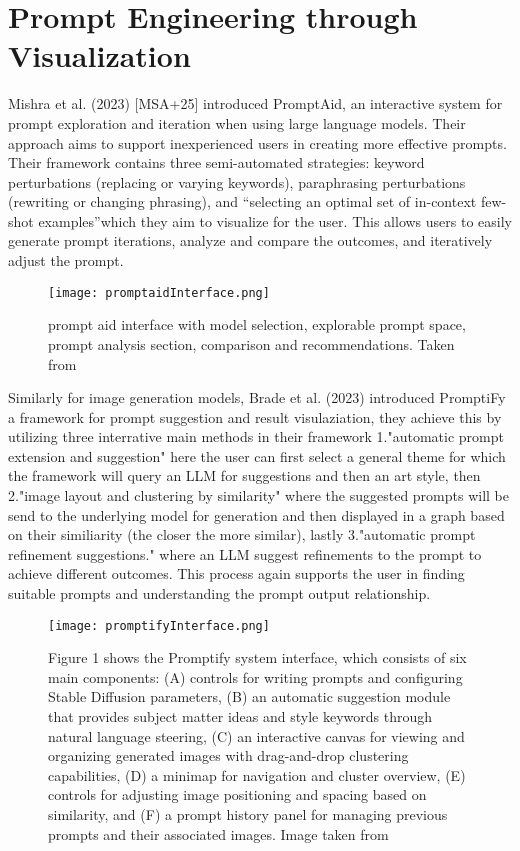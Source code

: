 \documentclass[
  a4paper,  %
  twoside,  %
  bibliography=totoc,
  headsepline,
  cleardoublepage=empty,
  parskip=half,
  draft=false
]{scrbook}
\begin{document}
\section{Prompt Engineering through Visualization}
Mishra et al. (2023) [MSA+25] introduced PromptAid, an interactive system for prompt exploration and iteration when using large language models. Their approach aims to support inexperienced users in creating more effective prompts. Their framework contains three semi-automated strategies: keyword perturbations (replacing or varying keywords), paraphrasing perturbations (rewriting or changing phrasing), and \enquote {selecting an optimal set of in-context few-shot examples}which they aim to visualize for the user. This allows users to easily generate prompt iterations, analyze and compare the outcomes, and iteratively adjust the prompt. \\
  \begin{figure}[H]
	\centering
	\texttt{[image: promptaidInterface.png]}
	\caption{prompt aid interface with model selection, explorable prompt space, prompt analysis section, comparison and recommendations. Taken from \cite{mishra2025promptaidpromptexplorationperturbation}}
	\label{fig:promptAid}
\end{figure}

Similarly for image generation models, Brade et al. (2023) \cite{brade2023promptifytexttoimagegenerationinteractive} introduced PromptiFy a framework for prompt suggestion and result visulaziation, they achieve this by utilizing three interrative main methods in their framework 1."automatic prompt extension and suggestion" here the user can first select a general theme for which the framework will query an LLM for suggestions and then an art style, then 2."image layout and clustering by similarity" where the suggested prompts will be send to the underlying model for generation and then displayed in a graph based on their similiarity (the closer the more similar), lastly
 3."automatic prompt refinement suggestions." where an LLM suggest refinements to the prompt to achieve different outcomes. 
 This process again supports the user in finding suitable prompts and understanding the prompt output relationship.\\
  \begin{figure}[H]
	\centering
	\texttt{[image: promptifyInterface.png]}
	\caption{ Figure 1 shows the Promptify system interface, which consists of six main components: (A) controls for writing prompts and configuring Stable Diffusion parameters, (B) an automatic suggestion module that provides subject matter ideas and style keywords through natural language steering, (C) an interactive canvas for viewing and organizing generated images with drag-and-drop clustering capabilities, (D) a minimap for navigation and cluster overview, (E) controls for adjusting image positioning and spacing based on similarity, and (F) a prompt history panel for managing previous prompts and their associated images. Image taken from \cite{mishra2025promptaidpromptexplorationperturbation}}
	\label{fig:promptify}
\end{figure}
\end{document}
